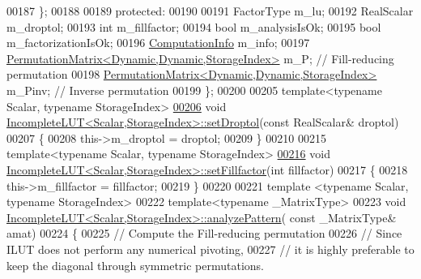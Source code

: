 \begin{DoxyCode}
00187     \};
00188 
00189 \textcolor{keyword}{protected}:
00190 
00191     FactorType m\_lu;
00192     RealScalar m\_droptol;
00193     \textcolor{keywordtype}{int} m\_fillfactor;
00194     \textcolor{keywordtype}{bool} m\_analysisIsOk;
00195     \textcolor{keywordtype}{bool} m\_factorizationIsOk;
00196     \hyperlink{group__enums_ga85fad7b87587764e5cf6b513a9e0ee5e}{ComputationInfo} m\_info;
00197     \hyperlink{group___core___module}{PermutationMatrix<Dynamic,Dynamic,StorageIndex>} m\_P;    
       \textcolor{comment}{// Fill-reducing permutation}
00198     \hyperlink{group___core___module}{PermutationMatrix<Dynamic,Dynamic,StorageIndex>} m\_Pinv; 
       \textcolor{comment}{// Inverse permutation}
00199 \};
00200 
00205 \textcolor{keyword}{template}<\textcolor{keyword}{typename} Scalar, \textcolor{keyword}{typename} StorageIndex>
\hyperlink{group___iterative_linear_solvers___module_a9628c5a595e9e984c72d1f8e671a6925}{00206} \textcolor{keywordtype}{void} \hyperlink{group___iterative_linear_solvers___module_a9628c5a595e9e984c72d1f8e671a6925}{IncompleteLUT<Scalar,StorageIndex>::setDroptol}(\textcolor{keyword}{const} 
      RealScalar& droptol)
00207 \{
00208   this->m\_droptol = droptol;   
00209 \}
00210 
00215 \textcolor{keyword}{template}<\textcolor{keyword}{typename} Scalar, \textcolor{keyword}{typename} StorageIndex>
\hyperlink{group___iterative_linear_solvers___module_a327767d12b55ff8a023f12a030051e17}{00216} \textcolor{keywordtype}{void} \hyperlink{group___iterative_linear_solvers___module_a327767d12b55ff8a023f12a030051e17}{IncompleteLUT<Scalar,StorageIndex>::setFillfactor}(\textcolor{keywordtype}{int}
       fillfactor)
00217 \{
00218   this->m\_fillfactor = fillfactor;   
00219 \}
00220 
00221 \textcolor{keyword}{template} <\textcolor{keyword}{typename} Scalar, \textcolor{keyword}{typename} StorageIndex>
00222 \textcolor{keyword}{template}<\textcolor{keyword}{typename} \_MatrixType>
00223 \textcolor{keywordtype}{void} \hyperlink{group___iterative_linear_solvers___module_class_eigen_1_1_incomplete_l_u_t}{IncompleteLUT<Scalar,StorageIndex>::analyzePattern}(\textcolor{keyword}{
      const} \_MatrixType& amat)
00224 \{
00225   \textcolor{comment}{// Compute the Fill-reducing permutation}
00226   \textcolor{comment}{// Since ILUT does not perform any numerical pivoting,}
00227   \textcolor{comment}{// it is highly preferable to keep the diagonal through symmetric permutations.}

\end{DoxyCode}
